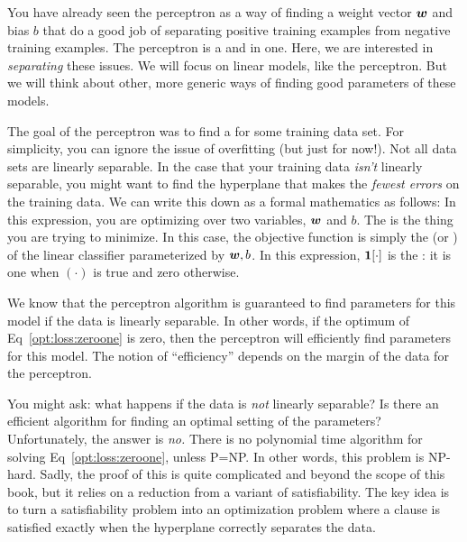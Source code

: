 You have already seen the perceptron as a way of finding a weight
vector ${\boldsymbol{w}}$ and bias $b$ that do a good job of separating positive
training examples from negative training examples.  The perceptron is
a  and  in one.  Here, we are
interested in \emph{separating} these issues.  We will focus on linear
models, like the perceptron.  But we will think about other, more
generic ways of finding good parameters of these models.

The goal of the perceptron was to find a  for some training data set.  For simplicity, you can
ignore the issue of overfitting (but just for now!).  Not all data
sets are linearly separable.  In the case that your training data
\emph{isn't} linearly separable, you might want to find the hyperplane
that makes the \emph{fewest errors} on the training data.  We can
write this down as a formal mathematics 
as follows:
%
%
In this expression, you are optimizing over two variables, ${\boldsymbol{w}}$ and
$b$.  The  is the thing you are trying to
minimize.  In this case, the objective function is simply the
 (or ) of the linear classifier
parameterized by ${\boldsymbol{w}},b$.  In this expression, $\boldsymbol{1}[\cdot]$ is the
: it is one when $(\cdot)$ is true and
zero otherwise.


We know that the perceptron algorithm is guaranteed to find parameters
for this model if the data is linearly separable.  In other words, if
the optimum of Eq~\eqref{opt:loss:zeroone} is zero, then the
perceptron will efficiently find parameters for this model.  The
notion of ``efficiency'' depends on the margin of the data for the
perceptron.

You might ask: what happens if the data is \emph{not} linearly
separable?  Is there an efficient algorithm for finding an optimal
setting of the parameters?  Unfortunately, the answer is \emph{no.}
There is no polynomial time algorithm for solving
Eq~\eqref{opt:loss:zeroone}, unless P=NP.  In other words, this
problem is NP-hard.  Sadly, the proof of this is quite complicated and
beyond the scope of this book, but it relies on a reduction from a
variant of satisfiability.  The key idea is to turn a satisfiability
problem into an optimization problem where a clause is satisfied
exactly when the hyperplane correctly separates the data.


